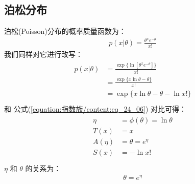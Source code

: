\documentclass[letterpaper,10pt,english]{sphinxmanual}
\begin{document}
\subsection{泊松分布}
\label{\detokenize{_u6307_u6570_u65cf/content:id5}}
泊松(Poisson)分布的概率质量函数为：
\begin{equation}\label{equation:指数族/content:指数族/content:11}
\begin{split}p(x|\theta) = \frac{\theta^x e^{-\theta}}{x!}\end{split}
\end{equation}
我们同样对它进行改写：
\begin{align}\label{equation:指数族/content:指数族/content:12}\!\begin{aligned}
p(x|\theta) &= \frac{ \exp\{ \ln [ \theta^x e^{-\theta} ]  \}}{x!}\\
&= \frac{ \exp\{ x \ln  \theta   -\theta  \} }{x!}\\
&= \exp \{ x \ln  \theta   -\theta  -  \ln x! \}\\
\end{aligned}\end{align}
和 公式(\ref{equation:指数族/content:eq_24_06}) 对比可得：
\begin{align}\label{equation:指数族/content:指数族/content:13}\!\begin{aligned}
\eta &= \phi(\theta) = \ln \theta\\
T(x) &= x\\
A(\eta) &=  \theta = e^{\eta}\\
S(x) &= - \ln x!\\
\end{aligned}\end{align}
\(\eta\) 和 \(\theta\) 的关系为：
\begin{equation}\label{equation:指数族/content:指数族/content:14}
\begin{split}\theta = e^{\eta}\end{split}
\end{equation}
\end{document}
